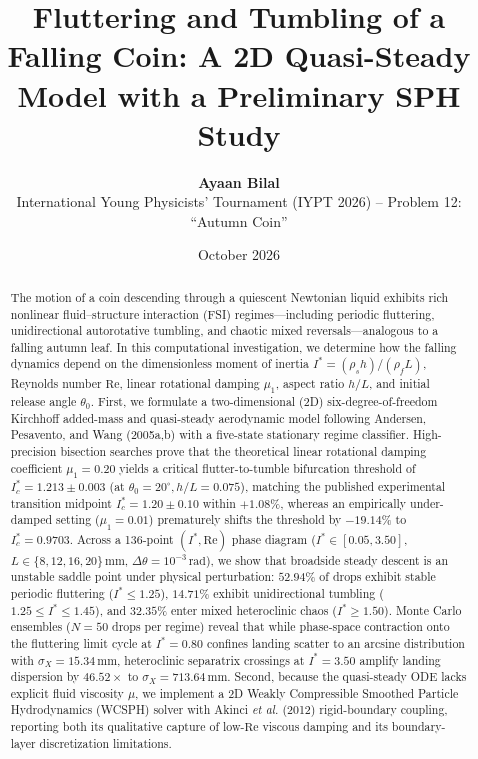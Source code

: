 \documentclass[10pt,a4paper,twocolumn]{article}
\title{\textbf{Fluttering and Tumbling of a Falling Coin: A 2D Quasi-Steady Model with a Preliminary SPH Study}}
\author{
    \textbf{Ayaan Bilal} \\
    \small International Young Physicists' Tournament (IYPT 2026) -- Problem 12: ``Autumn Coin''
}
\date{October 2026}
\begin{document}
\maketitle

\begin{abstract}
The motion of a coin descending through a quiescent Newtonian liquid exhibits rich nonlinear fluid--structure interaction (FSI) regimes---including periodic fluttering, unidirectional autorotative tumbling, and chaotic mixed reversals---analogous to a falling autumn leaf. In this computational investigation, we determine how the falling dynamics depend on the dimensionless moment of inertia $I^* = (\rho_s h)/(\rho_f L)$, Reynolds number $\mathrm{Re}$, linear rotational damping $\mu_1$, aspect ratio $h/L$, and initial release angle $\theta_0$. First, we formulate a two-dimensional (2D) six-degree-of-freedom Kirchhoff added-mass and quasi-steady aerodynamic model following Andersen, Pesavento, and Wang (2005a,b) with a five-state stationary regime classifier. High-precision bisection searches prove that the theoretical linear rotational damping coefficient $\mu_1 = 0.20$ yields a critical flutter-to-tumble bifurcation threshold of $I^*_c = 1.213 \pm 0.003$ (at $\theta_0 = 20^\circ, h/L = 0.075$), matching the published experimental transition midpoint $I^*_c = 1.20 \pm 0.10$ within $+1.08\%$, whereas an empirically under-damped setting ($\mu_1 = 0.01$) prematurely shifts the threshold by $-19.14\%$ to $I^*_c = 0.9703$. Across a 136-point $(I^*, \mathrm{Re})$ phase diagram ($I^* \in [0.05, 3.50]$, $L \in \{8, 12, 16, 20\}\,\mathrm{mm}$, $\Delta\theta = 10^{-3}\,\mathrm{rad}$), we show that broadside steady descent is an unstable saddle point under physical perturbation: $52.94\%$ of drops exhibit stable periodic fluttering ($I^* \le 1.25$), $14.71\%$ exhibit unidirectional tumbling ($1.25 \le I^* \le 1.45$), and $32.35\%$ enter mixed heteroclinic chaos ($I^* \ge 1.50$). Monte Carlo ensembles ($N = 50$ drops per regime) reveal that while phase-space contraction onto the fluttering limit cycle at $I^* = 0.80$ confines landing scatter to an arcsine distribution with $\sigma_X = 15.34\,\mathrm{mm}$, heteroclinic separatrix crossings at $I^* = 3.50$ amplify landing dispersion by $46.52\times$ to $\sigma_X = 713.64\,\mathrm{mm}$. Second, because the quasi-steady ODE lacks explicit fluid viscosity $\mu$, we implement a 2D Weakly Compressible Smoothed Particle Hydrodynamics (WCSPH) solver with Akinci \textit{et al.} (2012) rigid-boundary coupling, reporting both its qualitative capture of low-$\mathrm{Re}$ viscous damping and its boundary-layer discretization limitations.
\end{abstract}
\end{document}
